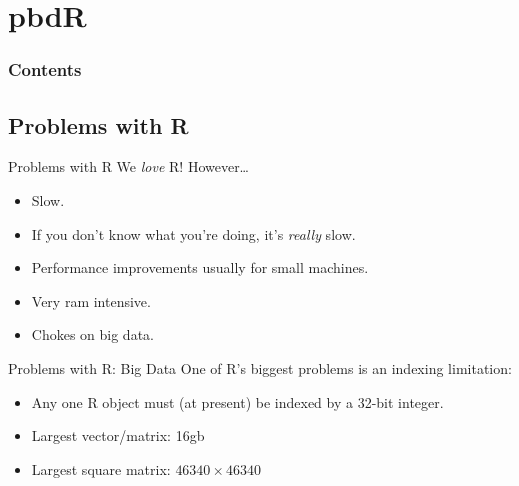 \section{pbdR}

\hidenum
\begin{frame}[noframenumbering]
\frametitle{Contents}
 \tableofcontents[currentsection,hideothersubsections,sectionstyle=show/hide]
\end{frame}
\shownum

\subsection{Problems with R}

\begin{frame}
  \begin{block}{Problems with R}\pause
  We \emph{love} R!  However\dots
  \begin{itemize}[<+-|alert@+>]
    \item Slow.
    \item If you don't know what you're doing, it's \emph{really} slow.
    \item Performance improvements usually for small machines.
    \item Very ram intensive.
    \item Chokes on big data.
  \end{itemize}
  \end{block}
\end{frame}

\begin{frame}
  \begin{block}{Problems with R: Big Data}\pause
  One of R's biggest problems is an indexing limitation:
  \begin{itemize}[<+-|alert@+>]
    \item Any one R object must (at present) be indexed by a 32-bit integer.
    \item Largest vector/matrix:  16gb
    \item Largest square matrix:  $46340\times 46340$
  \end{itemize}
  \end{block}
\end{frame}

